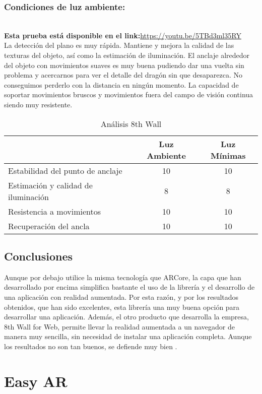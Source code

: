 \subsubsection{Condiciones de luz ambiente:}\\
\textbf{Esta prueba está disponible en el link:}\url{https://youtu.be/5TBd3ml35RY}\\

La detección del plano es muy rápida. Mantiene y mejora la calidad de las texturas del objeto, así como la estimación de iluminación. El anclaje alrededor del objeto con movimientos suaves es muy buena pudiendo dar una vuelta sin problema y acercarnos para ver el detalle del dragón sin que desaparezca. No conseguimos perderlo con la distancia en ningún momento. La capacidad de soportar movimientos bruscos y movimientos fuera del campo de visión continua siendo muy resistente.

\begin{table}[H]
    \centering
      \begin{tabular}{|l|c|c|}
    \hline
          & Luz Ambiente & Luz Mínimas \\
         \hline
        Estabilidad del punto de anclaje   &10 &10\\
        \hline
        Estimación y calidad de iluminación  &8 &8 \\
        \hline
        Resistencia a movimientos  &10 &10 \\
        \hline
        Recuperación del ancla  &10 &10 \\
      \hline
    \end{tabular}
    \caption{Análisis 8th Wall}
    \label{tab:T8thWall}
\end{table}
\subsection{Conclusiones}
Aunque por debajo utilice la misma tecnología que ARCore, la capa que han desarrollado por encima simplifica bastante el uso de la librería y el desarrollo de una aplicación con realidad aumentada. Por esta razón, y por los resultados obtenidos, que han sido excelentes, esta librería una muy buena opción para desarrollar una aplicación. Además, el otro producto que desarrolla la empresa, 8th Wall for Web, permite llevar la realidad aumentada a un navegador de manera muy sencilla, sin necesidad de instalar una aplicación completa. Aunque los resultados no son tan buenos, se defiende muy bien \cite{8thWallJini}.
\clearpage
\section{Easy AR}
